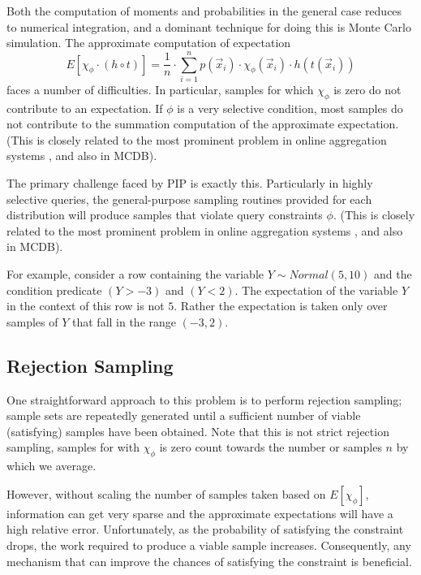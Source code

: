 

Both the computation of moments and probabilities in the general case reduces to numerical integration, and a dominant technique for doing this is Monte Carlo simulation. The approximate computation of expectation
\begin{equation}
E[\chi_\phi \cdot (h \circ t)] =
\frac{1}{n} \cdot \sum_{i=1}^n p(\vec{x}_i) \cdot \chi_\phi(\vec{x}_i) \cdot
h(t(\vec{x}_i))
\end{equation}
faces a number of difficulties.  In particular, samples for which $\chi_{\phi}$ is zero do not contribute to an expectation.  If $\phi$ is a very selective condition, most samples do not contribute to the summation computation of the approximate expectation.  (This is closely related to the most prominent problem in online aggregation systems \cite{OnlineAggregation,DBO}, and also in MCDB).

The primary challenge faced by PIP is exactly this. Particularly in highly selective queries, the general-purpose sampling routines provided for each distribution will produce samples that violate query constraints $\phi$.  (This is closely related to the most prominent problem in online aggregation systems \cite{OnlineAggregation,DBO}, and also in MCDB).

For example, consider a row containing the variable $Y \sim Normal(5,10)$ and the condition predicate $(Y > -3)$ and $(Y < 2)$.  The expectation of the variable $Y$ in the context of this row is not $5$.  Rather the expectation is taken only over samples of $Y$ that fall in the range $(-3,2)$.

\subsection{Rejection Sampling}
One straightforward approach to this problem is to perform rejection sampling; sample sets are repeatedly generated until a sufficient number of viable (satisfying) samples have been obtained.  Note that this is not strict rejection sampling, samples for with $\chi_{\phi}$ is zero count towards the number or samples $n$ by which we average.  

However, without scaling the number of samples taken based on $E[\chi_\phi]$, information can get very sparse and the approximate expectations will have a high relative error.  Unfortunately, as the probability of satisfying the constraint drops, the work required to produce a viable sample increases.   Consequently, any mechanism that can improve the chances of satisfying the constraint is beneficial.

